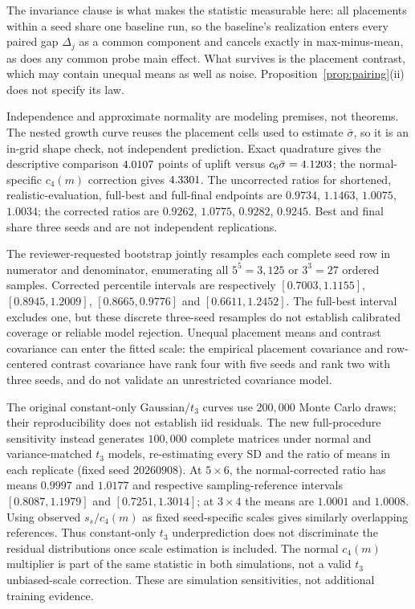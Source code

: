 \begin{remarkx}
The invariance clause is what makes the statistic measurable here: all
placements within a seed share one baseline run, so the baseline's
realization enters every paired gap $\Delta_j$ as a common component and
cancels exactly in max-minus-mean, as does any common probe main effect.
What survives is the placement contrast, which may contain unequal means
as well as noise. Proposition~\ref{prop:pairing}(ii) does not specify its law.
\end{remarkx}

\begin{remarkx}
Independence and approximate normality are modeling premises, not theorems.
The nested growth curve reuses the placement cells used to estimate
$\bar\sigma$, so it is an in-grid shape check, not independent prediction.
Exact quadrature gives the descriptive comparison $4.0107$ points of
uplift versus $c_6\bar\sigma=4.1203$; the normal-specific
$c_4(m)$ correction gives $4.3301$. The uncorrected ratios
for shortened, realistic-evaluation, full-best and full-final endpoints are
$0.9734$, $1.1463$, $1.0075$, $1.0034$; the corrected ratios are
$0.9262$, $1.0775$, $0.9282$, $0.9245$. Best and final share three seeds
and are not independent replications.

The reviewer-requested bootstrap jointly resamples each complete seed row
in numerator and denominator, enumerating all $5^5=3{,}125$ or $3^3=27$
ordered samples. Corrected percentile intervals are respectively
$[0.7003,1.1155]$, $[0.8945,1.2009]$, $[0.8665,0.9776]$ and
$[0.6611,1.2452]$. The full-best interval excludes one, but these discrete
three-seed resamples do not establish calibrated coverage or reliable model
rejection. Unequal placement means and contrast covariance can enter the
fitted scale: the empirical placement covariance and row-centered contrast
covariance have rank four with five seeds and rank two with three seeds,
and do not validate an unrestricted covariance model.

The original constant-only Gaussian/$t_3$ curves use $200{,}000$ Monte Carlo
draws; their reproducibility does not establish iid residuals. The new
full-procedure sensitivity instead generates $100{,}000$ complete matrices
under normal and variance-matched $t_3$ models, re-estimating every SD and
the ratio of means in each replicate (fixed seed $20260908$). At $5\times6$,
the normal-corrected ratio has means $0.9997$ and $1.0177$ and respective
sampling-reference intervals $[0.8087,1.1979]$ and $[0.7251,1.3014]$;
at $3\times4$ the means are $1.0001$ and $1.0008$. Using observed
$s_s/c_4(m)$ as fixed seed-specific scales gives similarly overlapping
references. Thus constant-only $t_3$ underprediction does not discriminate
the residual distributions once scale estimation is included. The normal
$c_4(m)$ multiplier is part of the same statistic in both simulations,
not a valid $t_3$ unbiased-scale correction. These are simulation
sensitivities, not additional training evidence.
\end{remarkx}

